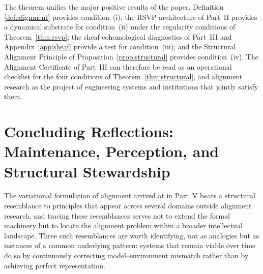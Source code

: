 \documentclass[12pt]{article}
\theoremstyle{definition}
\begin{document}
The theorem unifies the major positive results of the paper. Definition
\ref{def:alignment} provides condition~(i); the RSVP architecture of Part~II
provides a dynamical substrate for condition~(ii) under the regularity
conditions of Theorem~\ref{thm:rsvp}; the sheaf-cohomological diagnostics of
Part~III and Appendix~\ref{app:sheaf} provide a test for condition~(iii); and
the Structural Alignment Principle of Proposition~\ref{prop:structural} provides
condition~(iv). The Alignment Certificate of Part~III can therefore be read as
an operational checklist for the four conditions of Theorem~\ref{thm:structural},
and alignment research as the project of engineering systems and institutions
that jointly satisfy them.


\section*{Concluding Reflections: Maintenance, Perception, and Structural Stewardship}

The variational formulation of alignment arrived at in Part~V bears a structural
resemblance to principles that appear across several domains outside alignment
research, and tracing these resemblances serves not to extend the formal
machinery but to locate the alignment problem within a broader intellectual
landscape. Three such resemblances are worth identifying, not as analogies but
as instances of a common underlying pattern: systems that remain viable over
time do so by continuously correcting model--environment mismatch rather than by
achieving perfect representation.
\end{document}
